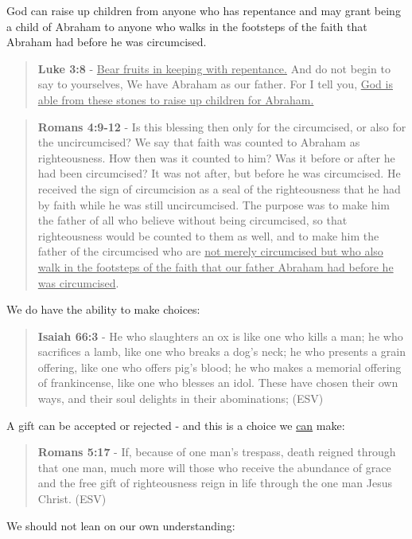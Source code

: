 \documentclass[11pt]{article}
\begin{document}
God can raise up children from anyone who has repentance and may grant being a child of Abraham to anyone who walks in the footsteps of the faith that Abraham had before he was circumcised.

\begin{quote}
\textbf{Luke 3:8} - \uline{Bear fruits in keeping with repentance.} And do not begin to say to yourselves, We have Abraham as our father. For I tell you, \uline{God is able from these stones to raise up children for Abraham.}
\end{quote}

\begin{quote}
\textbf{Romans 4:9-12} - Is this blessing then only for the circumcised, or also for the uncircumcised? We say that faith was counted to Abraham as righteousness. How then was it counted to him? Was it before or after he had been circumcised? It was not after, but before he was circumcised. He received the sign of circumcision as a seal of the righteousness that he had by faith while he was still uncircumcised. The purpose was to make him the father of all who believe without being circumcised, so that righteousness would be counted to them as well, and to make him the father of the circumcised who are \uline{not merely circumcised but who also walk in the footsteps of the faith that our father Abraham had before he was circumcised}.
\end{quote}

We do have the ability to make choices:

\begin{quote}
\textbf{Isaiah 66:3} - He who slaughters an ox is like one who kills a man; he who sacrifices a lamb, like one who breaks a dog's neck; he who presents a grain offering, like one who offers pig's blood; he who makes a memorial offering of frankincense, like one who blesses an idol. These have chosen their own ways, and their soul delights in their abominations; (ESV)
\end{quote}

A gift can be accepted or rejected - and this is a choice we \uline{can} make:

\begin{quote}
\textbf{Romans 5:17} - If, because of one man's trespass, death reigned through that one man, much more will those who receive the abundance of grace and the free gift of righteousness reign in life through the one man Jesus Christ. (ESV)
\end{quote}

We should not lean on our own understanding:
\end{document}
